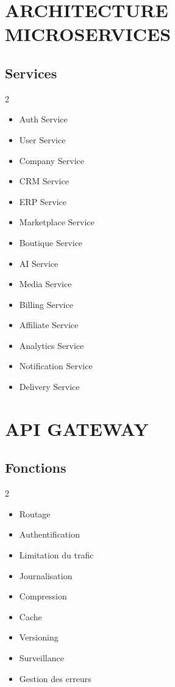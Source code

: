 \documentclass[12pt,a4paper,oneside]{book}
\begin{document}
\chapter{ARCHITECTURE MICROSERVICES}

\section{Services}
\begin{multicols}{2}
\begin{itemize}
\item Auth Service
\item User Service
\item Company Service
\item CRM Service
\item ERP Service
\item Marketplace Service
\item Boutique Service
\item AI Service
\item Media Service
\item Billing Service
\item Affiliate Service
\item Analytics Service
\item Notification Service
\item Delivery Service
\end{itemize}
\end{multicols}

\chapter{API GATEWAY}

\section{Fonctions}
\begin{multicols}{2}
\begin{itemize}
\item Routage
\item Authentification
\item Limitation du trafic
\item Journalisation
\item Compression
\item Cache
\item Versioning
\item Surveillance
\item Gestion des erreurs
\end{itemize}
\end{multicols}
\end{document}
